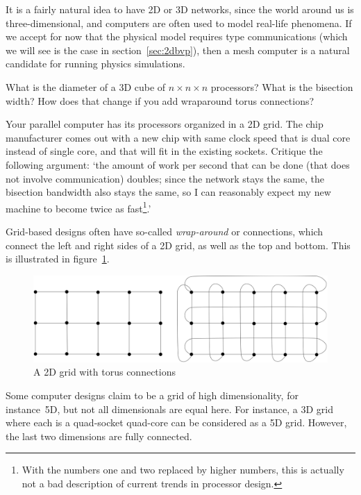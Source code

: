 It is a fairly natural idea to have 2D or 3D networks, since the world
around us is three-dimensional, and computers are often used to model
real-life phenomena. If we accept for now that the physical model
requires  type communications (which we
will see is the case in section~\ref{sec:2dbvp}), then a mesh computer
is a natural candidate for running physics simulations.

\begin{exercise}
  What is the diameter of a 3D cube of $n\times n\times n$ processors? What is the
  bisection width? How does that change if you add wraparound torus
  connections?
\end{exercise}

\begin{exercise}
  Your parallel computer has its processors organized in a 2D grid.
  The chip manufacturer comes out with a new chip with same clock
  speed that is dual core instead of single core, and that will fit in
  the existing sockets. Critique the following argument: `the amount of
  work per second that can be done (that does not involve communication)
  doubles; since the network stays the same, the bisection bandwidth
  also stays the same, so I can reasonably expect my new machine to
  become twice as fast\footnote{With the numbers one and two replaced
    by higher numbers, this is actually not a bad description of
    current trends in processor design.}.'
\end{exercise}

Grid-based designs often have so-called \emph{wrap-around} or
 connections, which connect the left and right sides
of a 2D grid, as well as the top and bottom. This is illustrated in
figure~\ref{fig:torus}.
\begin{figure}[th]
  \includegraphics[scale=.11]{graphics/torus}
  \caption{A 2D grid with torus connections}
  \label{fig:torus}
\end{figure}

Some computer designs claim to be a grid of high dimensionality, for
instance~5D, but not all dimensionals are equal here. For instance, a 3D
grid where each  is a quad-socket 
quad-core can be considered as a
5D grid. However, the last two dimensions are fully connected.

